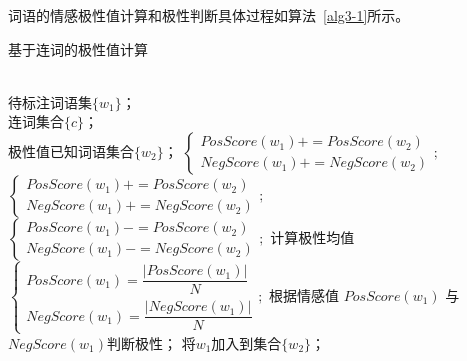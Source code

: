 词语的情感极性值计算和极性判断具体过程如算法~\ref{alg3-1}所示。
\begin{algorithm}[htp]
\caption{基于连词的极性值计算}
\label{alg3-1}
\begin{algorithmic}[1]
\REQUIRE ~~\\
待标注词语集$\{w_1\}$；\\
连词集合$\{c\}$；\\
极性值已知词语集合$\{w_2\}$；
\STATE $
\begin{cases}
PosScore(w_1)+=PosScore(w_2)\\
NegScore(w_1)+=NegScore(w_2)
\end{cases};$
\ELSE
{}
\STATE $
\begin{cases}
PosScore(w_1)+=PosScore(w_2)\\
NegScore(w_1)+=NegScore(w_2)
\end{cases};$
\ENDIF
{}
\STATE $
\begin{cases}
PosScore(w_1)-=PosScore(w_2)\\
NegScore(w_1)-=NegScore(w_2)
\end{cases};$
\ENDIF
\ENDIF
\ENDFOR
\STATE 计算极性均值$
\begin{cases}
PosScore(w_1)=\dfrac{|PosScore(w_1)|}{N}\\
NegScore(w_1)=\dfrac{|NegScore(w_1)|}{N}
\end{cases};$
\STATE 根据情感值 $PosScore(w_1)$ 与$ NegScore(w_1) $判断极性；
\STATE 将$ w_1 $加入到集合$ \{w_2\} $；
\ENDFOR
\end{algorithmic}
\end{algorithm}

